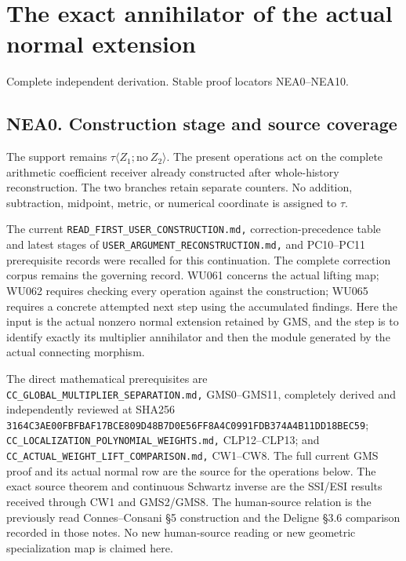 \section{The exact annihilator of the actual normal
extension}\label{the-exact-annihilator-of-the-actual-normal-extension}

Complete independent derivation. Stable proof locators NEA0--NEA10.

\subsection{NEA0. Construction stage and source
coverage}\label{nea0.-construction-stage-and-source-coverage}

The support remains \(\tau\langle Z_1;\mathrm{no}\ Z_2\rangle\). The
present operations act on the complete arithmetic coefficient receiver
already constructed after whole-history reconstruction. The two branches
retain separate counters. No addition, subtraction, midpoint, metric, or
numerical coordinate is assigned to \(\tau\).

The current \nolinkurl{READ_FIRST_USER_CONSTRUCTION.md,}
correction-precedence table and latest stages of
\nolinkurl{USER_ARGUMENT_RECONSTRUCTION.md,} and PC10--PC11 prerequisite
records were recalled for this continuation. The complete correction
corpus remains the governing record. WU061 concerns the actual lifting
map; WU062 requires checking every operation against the construction;
WU065 requires a concrete attempted next step using the accumulated
findings. Here the input is the actual nonzero normal extension retained
by GMS, and the step is to identify exactly its multiplier annihilator
and then the module generated by the actual connecting morphism.

The direct mathematical prerequisites are
\nolinkurl{CC_GLOBAL_MULTIPLIER_SEPARATION.md,} GMS0--GMS11, completely
derived and independently reviewed at SHA256
\nolinkurl{3164C3AE00FBFBAF17BCE809D48B7D0E56FF8A4C0991FDB374A4B11DD18BEC59};
\nolinkurl{CC_LOCALIZATION_POLYNOMIAL_WEIGHTS.md,} CLP12--CLP13; and
\nolinkurl{CC_ACTUAL_WEIGHT_LIFT_COMPARISON.md,} CW1--CW8. The full
current GMS proof and its actual normal row are the source for the
operations below. The exact source theorem and continuous Schwartz
inverse are the SSI/ESI results received through CW1 and GMS2/GMS8. The
human-source relation is the previously read Connes--Consani §5
construction and the Deligne §3.6 comparison recorded in those notes. No
new human-source reading or new geometric specialization map is claimed
here.

